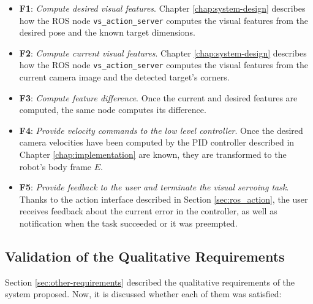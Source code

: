 \begin{itemize}
	\item \textbf{F1}: \emph{Compute desired visual features}. Chapter \ref{chap:system-design} describes how the ROS node \texttt{vs\_action\_server} computes the visual features from the desired pose and the known target dimensions.
	
	\item \textbf{F2}: \emph{Compute current visual features}. Chapter \ref{chap:system-design} describes how the ROS node \texttt{vs\_action\_server} computes the visual features from the current camera image and the detected target's corners.
	
	\item \textbf{F3}: \emph{Compute feature difference}. Once the current and desired features are computed, the same node computes its difference.
	
	\item \textbf{F4}: \emph{Provide velocity commands to the low level controller}. Once the desired camera velocities have been computed by the PID controller described in Chapter \ref{chap:implementation} are known, they are transformed to the robot's body frame $E$.
	
	\item \textbf{F5}: \emph{Provide feedback to the user and terminate the visual servoing task}. Thanks to the action interface described in Section \ref{sec:ros_action}, the user receives feedback about the current error in the controller, as well as notification when the task succeeded or it was preempted.
\end{itemize}

\subsection{Validation of the Qualitative Requirements}
\label{sec:sec:other-requirements-validation}

Section \ref{sec:other-requirements} described the qualitative requirements of the system proposed. Now, it is discussed whether each of them was satisfied:

